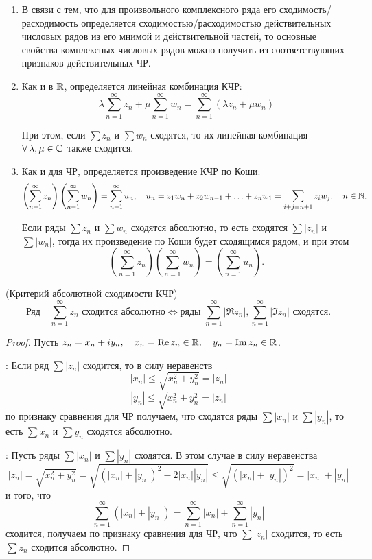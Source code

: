 \documentclass[../../main.tex]{subfiles}
\begin{document}
\begin{rems}
	\begin{enumerate}
		\;
		
		\item В связи с тем, что для произвольного комплексного ряда его 
		сходимость/расходимость определяется сходимостью/расходимостью 
		действительных 
		числовых рядов из его мнимой и действительной частей, то основные свойства 
		комплексных числовых рядов можно получить из соответствующих признаков 
		действительных ЧР.
		
		\item Как и в $ \mathbb{R} $, определяется линейная комбинация КЧР:
		\[\lambda \sum_{n=1}^{\infty}z_n + \mu \sum_{n=1}^{\infty}w_n = 
		\sum_{n=1}^{\infty}(\lambda z_n + \mu w_n)\]
		
		При этом, если $ \sum z_n $ и $ \sum w_n $ сходятся, то их линейная 
		комбинация $ \forall\, \lambda, \mu \in \mathbb{C} $ также сходится.
		
		\item Как и для ЧР, определяется произведение КЧР по Коши:
		\[\left(\sum_{n=1}^{\infty}z_n\right)\left(\sum_{n=1}^{\infty}w_n\right) 
		= \sum_{n=1}^{\infty} 
		u_n, \quad u_n = z_1w_{n} + z_2w_{n - 1} + \ldots + z_nw_1 = \sum_{i + j = n 
		+ 1} z_iw_j, \quad n \in \mathbb{N}.\]
		
		Если ряды $ \sum z_n $ и $ \sum w_n $ сходятся абсолютно, то есть сходятся $ 
		\sum |z_n| $ и $ \sum |w_n| $, тогда их произведение по Коши будет 
		сходящимся рядом, и при этом
		\[\left(\sum_{n=1}^{\infty}z_n\right)\left(\sum_{n=1}^{\infty}w_n\right) = 
		\left(\sum_{n=1}^{\infty}u_n\right).\]
	\end{enumerate}
\end{rems}

\begin{thm}(Критерий абсолютной сходимости КЧР)
	\[\text{Ряд} \quad \sum_{n=1}^{\infty}z_n \text{ сходится абсолютно} \iff 
	\text{ряды } \sum_{n=1}^{\infty}|\Re z_n|, \sum_{n=1}^{\infty}|\Im z_n| 
	\text{ сходятся.}\]
\end{thm}
\begin{proof}
	Пусть $ z_n = x_n + iy_n, \quad x_n = \operatorname{Re} z_n \in \mathbb{R}, \quad y_n = \operatorname{Im} z_n \in 
	\mathbb{R} $.
	
	\nec: Если ряд $ \sum |z_n| $ сходится, то в силу неравенств
	\[|x_n| \leq \sqrt{x_n^2 + y_n^2} = |z_n|\]
	\[|y_n| \leq \sqrt{x_n^2 + y_n^2} = |z_n|\]
	по признаку сравнения для ЧР получаем, что сходятся ряды $ \sum |x_n| $ и $ 
	\sum |y_n| $, то есть $ \sum x_n $ и $ \sum y_n $ сходятся абсолютно.
	
	\suff: Пусть ряды $ \sum |x_n| $ и $ \sum |y_n| $ сходятся. В этом случае в 
	силу неравенства
	\[|z_n| = \sqrt{x_n^2 + y_n^2} = \sqrt{(|x_n| + |y_n|)^2 - 2|x_n||y_n|} \leq 
	\sqrt{(|x_n| + |y_n|)^2} = |x_n| + |y_n|\]
	и того, что
	\[\sum_{n=1}^{\infty}(|x_n| + |y_n|) = \sum_{n=1}^{\infty}|x_n| + 
	\sum_{n=1}^{\infty}|y_n|\]
	сходится, получаем по признаку сравнения для ЧР, что $ \sum |z_n| $ сходится, 
	то есть  $ \sum z_n $ сходится абсолютно.
\end{proof}
\end{document}
